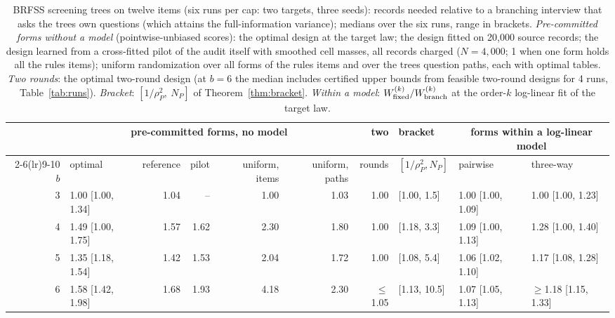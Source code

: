 \begin{table}[t]
\centering
\caption{BRFSS screening trees on twelve items (six runs per cap: two targets, three seeds): records needed relative to a branching interview that asks the tree\textquotesingle s own questions (which attains the full-information variance); medians over the six runs, range in brackets. \emph{Pre-committed forms without a model} (pointwise-unbiased scores): the optimal design at the target law; the design fitted on 20,000 source records; the design learned from a cross-fitted pilot of the audit itself with smoothed cell masses, all records charged ($N=4{,}000$; 1 when one form holds all the rule\textquotesingle s items); uniform randomization over all forms of the rule\textquotesingle s items and over the tree\textquotesingle s question paths, each with optimal tables. \emph{Two rounds}: the optimal two-round design (at $b=6$ the median includes certified upper bounds from feasible two-round designs for 4 runs, Table~\ref{tab:runs}). \emph{Bracket}: $[1/\rho_P^2,\ N_P]$ of Theorem~\ref{thm:bracket}. \emph{Within a model}: $W^{(k)}_{\rm fixed}/W^{(k)}_{\rm branch}$ at the order-$k$ log-linear fit of the target law.}
\label{tab:screening}
\footnotesize
\setlength{\tabcolsep}{2.4pt}
\begin{tabular}{r l r r r r r l l l}
\toprule
 & \multicolumn{5}{c}{pre-committed forms, no model} & two & bracket & \multicolumn{2}{c}{forms within a log-linear model} \\
\cmidrule(lr){2-6}\cmidrule(lr){9-10}
$b$ & optimal & reference & pilot & uniform, items & uniform, paths & rounds & $[1/\rho_P^2,N_P]$ & pairwise & three-way \\
\midrule
3 & 1.00 [1.00, 1.34] & 1.04 & -- & 1.00 & 1.03 & 1.00 & [1.00, 1.5] & 1.00 [1.00, 1.09] & 1.00 [1.00, 1.23] \\
4 & 1.49 [1.00, 1.75] & 1.57 & 1.62 & 2.30 & 1.80 & 1.00 & [1.18, 3.3] & 1.09 [1.00, 1.13] & 1.28 [1.00, 1.40] \\
5 & 1.35 [1.18, 1.54] & 1.42 & 1.53 & 2.04 & 1.72 & 1.00 & [1.08, 5.4] & 1.06 [1.02, 1.10] & 1.17 [1.08, 1.28] \\
6 & 1.58 [1.42, 1.98] & 1.68 & 1.93 & 4.18 & 2.30 & $\le$1.05 & [1.13, 10.5] & 1.07 [1.05, 1.13] & $\ge$1.18 [1.15, 1.33] \\
\bottomrule
\end{tabular}
\end{table}
